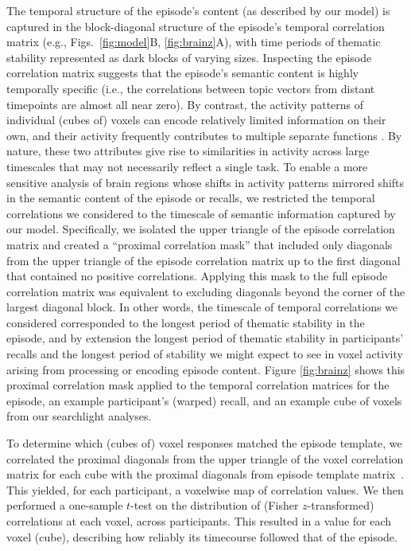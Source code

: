 \documentclass[10pt]{article}
\begin{document}
The temporal structure of the episode's content (as described by our model) is captured in the block-diagonal structure of the episode's temporal correlation matrix (e.g., Figs.~\ref{fig:model}B, \ref{fig:brainz}A), with time periods of thematic stability represented as dark blocks of varying sizes.  Inspecting the episode correlation matrix suggests that the episode's semantic content is highly temporally specific (i.e., the correlations between topic vectors from distant timepoints are almost all near zero).  By contrast, the activity patterns of individual (cubes of) voxels can encode relatively limited information on their own, and their activity frequently contributes to multiple separate functions \citep{FreeEtal01, SigmDeha08, CharKoec10, RishEtal13}.  By nature, these two attributes give rise to similarities in activity across large timescales that may not necessarily reflect a single task.  To enable a more sensitive analysis of brain regions whose shifts in activity patterns mirrored shifts in the semantic content of the episode or recalls, we restricted the temporal correlations we considered to the timescale of semantic information captured by our model.  Specifically, we isolated the upper triangle of the episode correlation matrix and created a ``proximal correlation mask'' that included only diagonals from the upper triangle of the episode correlation matrix up to the first diagonal that contained no positive correlations.  Applying this mask to the full episode correlation matrix was equivalent to excluding diagonals beyond the corner of the largest diagonal block.  In other words, the timescale of temporal correlations we considered corresponded to the longest period of thematic stability in the episode, and by extension the longest period of thematic stability in participants' recalls and the longest period of stability we might expect to see in voxel activity arising from processing or encoding episode content.  Figure \ref{fig:brainz} shows this proximal correlation mask applied to the temporal correlation matrices for the episode, an example participant's (warped) recall, and an example cube of voxels from our searchlight analyses.

To determine which (cubes of) voxel responses matched the episode template, we correlated the proximal diagonals from the upper triangle of the voxel correlation matrix for each cube with the proximal diagonals from episode template matrix~\citep{KrieEtal08b}.  This yielded, for each participant, a voxelwise map of correlation values.  We then performed a one-sample $t$-test on the distribution of (Fisher $z$-transformed) correlations at each voxel, across participants.  This resulted in a value for each voxel (cube), describing how reliably its timecourse followed that of the episode.
\end{document}
